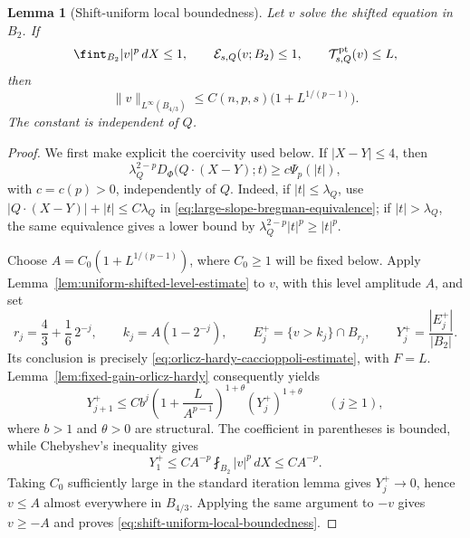\documentclass[11pt,reqno]{amsart}
\numberwithin{equation}{section}
\newcommand{\dd}{\,d}
\newtheorem{lemma}[theorem]{Lemma}
\theoremstyle{remark}
\begin{document}
\begin{lemma}[Shift-uniform local boundedness]
\label{lem:shift-uniform-local-boundedness}
Let \(v\) solve the shifted equation in \(B_2\).  If
\[
 \fint_{B_2}|v|^p\dd X\le1,\qquad
 \mathcal E_{s,Q}(v;B_2)\le1,\qquad
 \mathcal T^{\rm pt}_{s,Q}(v)\le L,
\]
then
\begin{equation}
 \|v\|_{L^\infty(B_{4/3})}
 \le C(n,p,s)\bigl(1+L^{1/(p-1)}\bigr).
 \label{eq:shift-uniform-local-boundedness}
\end{equation}
The constant is independent of \(Q\).
\end{lemma}

\begin{proof}
We first make explicit the coercivity used below.  If
\(|X-Y|\le4\), then
\begin{equation}
 \lambda_Q^{2-p}D_\Phi\bigl(Q\cdot(X-Y);t\bigr)
 \ge c\Psi_p(|t|),
 \label{eq:shift-uniform-orlicz-coercivity}
\end{equation}
with \(c=c(p)>0\), independently of \(Q\).  Indeed, if
\(|t|\le\lambda_Q\), use
\(|Q\cdot(X-Y)|+|t|\le C\lambda_Q\) in
\eqref{eq:large-slope-bregman-equivalence}; if
\(|t|>\lambda_Q\), the same equivalence gives a lower bound by
\(\lambda_Q^{2-p}|t|^p\ge|t|^p\).

Choose \(A=C_0(1+L^{1/(p-1)})\), where \(C_0\ge1\) will be fixed
below.  Apply Lemma~\ref{lem:uniform-shifted-level-estimate} to \(v\),
with this level amplitude \(A\), and set
\begin{equation*}
 r_j=\frac43+\frac16\,2^{-j},\qquad
 k_j=A(1-2^{-j}),\qquad
 E_j^+=\{v>k_j\}\cap B_{r_j},\qquad
 Y_j^+=\frac{|E_j^+|}{|B_2|}.
\end{equation*}
Its conclusion is precisely
\eqref{eq:orlicz-hardy-caccioppoli-estimate}, with \(F=L\).
Lemma~\ref{lem:fixed-gain-orlicz-hardy} consequently yields
\begin{equation*}
 Y_{j+1}^+\le Cb^j
 \left(1+\frac{L}{A^{p-1}}\right)^{1+\theta}
 (Y_j^+)^{1+\theta}\qquad(j\ge1),
\end{equation*}
where \(b>1\) and \(\theta>0\) are structural.  The coefficient in
parentheses is bounded, while Chebyshev's inequality gives
\[
 Y_1^+\le C A^{-p}\fint_{B_2}|v|^p\dd X\le CA^{-p}.
\]
Taking \(C_0\) sufficiently large in the standard iteration lemma gives
\(Y_j^+\to0\), hence \(v\le A\) almost everywhere in \(B_{4/3}\).
Applying the same argument to \(-v\) gives \(v\ge-A\) and proves
\eqref{eq:shift-uniform-local-boundedness}.
\end{proof}
\end{document}
